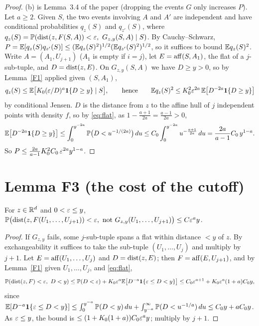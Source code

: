 \documentclass[11pt]{article}
\begin{document}
\begin{proof}
(b) is Lemma~3.4 of the paper (dropping the events $G$ only increases $P$). Let $a\ge2$. Given $S$, the two events
involving $A$ and $A'$ are independent and have conditional probabilities $q_z(S)$ and $q_{z'}(S)$, where
$q_z(S)=\Pr(\dist(z,F(S,A))<\eps,\ G_{z,y}(S,A)\mid S)$. By Cauchy--Schwarz, $P=\mathbb{E}[q_z(S)q_{z'}(S)]\le(\mathbb{E} q_z(S)^2)^{1/2}(\mathbb{E} q_{z'}(S)^2)^{1/2}$,
so it suffices to bound $\mathbb{E} q_z(S)^2$. Write $A=(A_1,U_{j+1})$ ($A_1$ is empty if $i=j$), let $E=\operatorname{aff}(S,A_1)$, the flat of a
$j$-sub-tuple, and $D=\operatorname{dist}(z,E)$. On $G_{z,y}(S,A)$ we have $D\ge y>0$, so by Lemma~\ref{F1} applied given $(S,A_1)$,
\[
  q_z(S)\le\mathbb{E}\bigl[K_0(\varepsilon/D)^a\mathbf{1}\{D\ge y\}\mid S\bigr],\qquad\text{hence}\qquad
  \mathbb{E} q_z(S)^2\le K_0^2\varepsilon^{2a}\,\mathbb{E}\bigl[D^{-2a}\mathbf{1}\{D\ge y\}\bigr]
\]
by conditional Jensen. $D$ is the distance from $z$ to the affine hull of $j$ independent points with density $f$, so by
\eqref{eq:flat}, as $1-\frac{a+1}{2a}=\frac{a-1}{2a}>0$,
\[
  \mathbb{E}\bigl[D^{-2a}\mathbf{1}\{D\ge y\}\bigr]\le\int_0^{y^{-2a}}\mathbb{P}\bigl(D<u^{-1/(2a)}\bigr)\,du\le C_0\int_0^{y^{-2a}}u^{-\frac{a+1}{2a}}\,du
  =\frac{2a}{a-1}C_0\,y^{1-a}.
\]
So $P\le\frac{2a}{a-1}K_0^2C_0\,\varepsilon^{2a}y^{1-a}$.
\end{proof}

\section*{Lemma F3 (the cost of the cutoff)}

\begin{lemma}\label{F3}
For $z\in\mathbb{R}^d$ and $0<\varepsilon\le y$,
$\Pr\bigl(\dist(z,F(U_1,\dots,U_{j+1}))<\eps,\ \text{not }G_{z,y}(U_1,\dots,U_{j+1})\bigr)\le C\eps^ay$.
\end{lemma}

\begin{proof}
If $G_{z,y}$ fails, some $j$-sub-tuple spans a flat within distance $<y$ of $z$. By exchangeability it suffices to take the
sub-tuple $(U_1,\dots,U_j)$ and multiply by $j+1$. Let $E=\operatorname{aff}(U_1,\dots,U_j)$ and $D=\operatorname{dist}(z,E)$; then
$F=\operatorname{aff}(E,U_{j+1})$, and by Lemma~\ref{F1} given $U_1,\dots,U_j$, and \eqref{eq:flat},
\[
  \Pr(\dist(z,F)<\eps,\ D<y)\le\Pr(D<\eps)+K_0\eps^a\E\bigl[D^{-a}\Cone\{\eps\le D<y\}\bigr]\le C_0\eps^{a+1}+K_0\eps^a(1+a)C_0y,
\]
since $\mathbb{E}[D^{-a}\mathbf{1}\{\varepsilon\le D<y\}]\le\int_0^{y^{-a}}\mathbb{P}(D<y)\,du+\int_{y^{-a}}^{\infty}\mathbb{P}(D<u^{-1/a})\,du\le C_0y+aC_0y$. As $\varepsilon\le y$, the
bound is $\le(1+K_0(1+a))C_0\varepsilon^ay$; multiply by $j+1$.
\end{proof}
\end{document}

